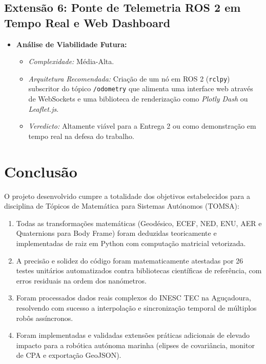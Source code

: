 \documentclass[11pt,a4paper]{article}
\begin{document}
\subsection{Extensão 6: Ponte de Telemetria ROS 2 em Tempo Real e Web Dashboard}
\begin{itemize}
    \item \textbf{Análise de Viabilidade Futura:}
    \begin{itemize}
        \item \textit{Complexidade:} Média-Alta.
        \item \textit{Arquitetura Recomendada:} Criação de um nó em ROS 2 (\texttt{rclpy}) subscritor do tópico \texttt{/odometry} que alimenta uma interface web através de WebSockets e uma biblioteca de renderização como \textit{Plotly Dash} ou \textit{Leaflet.js}.
        \item \textit{Veredicto:} Altamente viável para a Entrega 2 ou como demonstração em tempo real na defesa do trabalho.
    \end{itemize}
\end{itemize}

\section{Conclusão}

O projeto desenvolvido cumpre a totalidade dos objetivos estabelecidos para a disciplina de Tópicos de Matemática para Sistemas Autónomos (TOMSA):
\begin{enumerate}
    \item Todas as transformações matemáticas (Geodésico, ECEF, NED, ENU, AER e Quaternions para Body Frame) foram deduzidas teoricamente e implementadas de raiz em Python com computação matricial vetorizada.
    \item A precisão e solidez do código foram matematicamente atestadas por 26 testes unitários automatizados contra bibliotecas científicas de referência, com erros residuais na ordem dos nanómetros.
    \item Foram processados dados reais complexos do INESC TEC na Aguçadoura, resolvendo com sucesso a interpolação e sincronização temporal de múltiplos robôs assíncronos.
    \item Foram implementadas e validadas extensões práticas adicionais de elevado impacto para a robótica autónoma marinha (elipses de covariância, monitor de CPA e exportação GeoJSON).
\end{enumerate}
\end{document}
